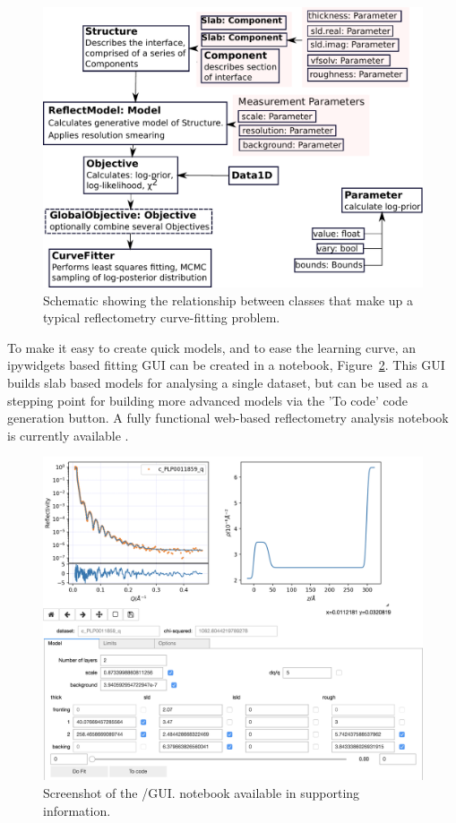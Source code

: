 \documentclass[12pt]{article}
\begin{document}
\begin{figure}
  \includegraphics[width=\linewidth]{components}
  \caption{Schematic showing the relationship between classes that make up a typical reflectometry curve-fitting problem.}
  \label{fig:components}
\end{figure}

To make it easy to create quick models, and to ease the learning curve, an ipywidgets \cite{ipywidgets} based fitting GUI can be created in a \Jupyter notebook, Figure~\ref{fig:gui}. This GUI builds slab based models for analysing a single dataset, but can be used as a stepping point for building more advanced models via the 'To code' code generation button. A fully functional web-based reflectometry analysis notebook is currently available \cite{Nelson2018}.

\begin{figure}
  \includegraphics[width=\linewidth]{./datasets/gui.png}
  \caption{Screenshot of the \Jupyter/\ipywidgets GUI. \Jupyter notebook available in supporting information.}
  \label{fig:gui}
\end{figure}
\end{document}
